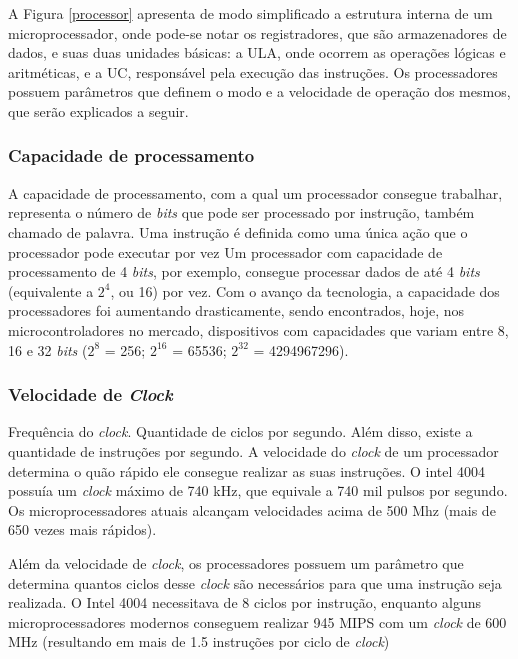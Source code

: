 
A Figura \ref{processor} apresenta de modo simplificado a estrutura interna de um microprocessador, onde pode-se notar os registradores, que são armazenadores de dados, e suas duas unidades básicas: a \ac{ULA}, onde ocorrem as operações lógicas e aritméticas, e a \ac{UC}, responsável pela execução das instruções. %
Os processadores possuem parâmetros que definem o modo e a velocidade de operação dos mesmos, que serão explicados a seguir.

\subsubsection{Capacidade de processamento}

A capacidade de processamento, com a qual um processador consegue trabalhar, representa o número de \textit{bits} que pode ser processado por instrução, também chamado de palavra. Uma instrução é definida como uma única ação que o processador pode executar por vez %
Um processador com capacidade de processamento de 4 \textit{bits}, por exemplo, consegue processar dados de até 4 \textit{bits} (equivalente a \(2^4\), ou 16) por vez. Com o avanço da tecnologia, a capacidade dos processadores foi aumentando drasticamente, sendo encontrados, hoje, nos microcontroladores no mercado, dispositivos com capacidades que variam entre 8, 16 e 32 \textit{bits} (\(2^8\) = 256; \(2^16\) = 65536; \(2^32\) = 4294967296).

\subsubsection{Velocidade de \textit{Clock}}

Frequência do \textit{clock}. Quantidade de ciclos por segundo. Além disso, existe a quantidade de instruções por segundo. A velocidade do \textit{clock} de um processador determina o quão rápido ele consegue realizar as suas instruções. O intel 4004 possuía um \textit{clock} máximo de 740 kHz, que equivale a 740 mil pulsos por segundo. Os microprocessadores atuais alcançam velocidades acima de 500 Mhz (mais de 650 vezes mais rápidos). 

Além da velocidade de \textit{clock}, os processadores possuem um parâmetro que determina quantos ciclos desse \textit{clock} são necessários para que uma instrução seja realizada. O Intel 4004 necessitava de 8 ciclos por instrução, enquanto alguns microprocessadores modernos conseguem realizar 945 \ac{MIPS} com um \textit{clock} de 600 MHz (resultando em mais de 1.5 instruções por ciclo de \textit{clock}) %


